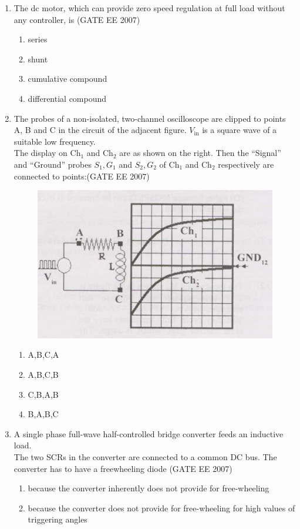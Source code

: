 \documentclass[a4paper,10pt]{exam}
\theoremstyle{remark}
\begin{document}
\begin{enumerate}
\item  The dc motor, which can provide zero speed regulation at full load without any controller, is \hfill{(GATE EE 2007)} 

\begin{multicols}{4}
\begin{enumerate}
 \item series
\item  shunt
\item cumulative compound
\item  differential compound
\end{enumerate}
\end{multicols}

\item  The probes of a non-isolated, two-channel oscilloscope are clipped to points A, B and C in the circuit of the adjacent figure. $V_{\text{in}}$ is a square wave of a suitable low frequency. \\
The display on Ch$_1$ and Ch$_2$ are as shown on the right. Then the ``Signal'' and ``Ground'' probes $S_1, G_1$ and $S_2, G_2$ of Ch$_1$ and Ch$_2$ respectively are connected to points:\hfill{(GATE EE 2007)} 

\begin{figure}[H]
    \centering
    \includegraphics[width=0.6\linewidth]{figs/Q 17.png}
\end{figure}

\begin{multicols}{4}
\begin{enumerate}
 \item  A,B,C,A
\item A,B,C,B
\item  C,B,A,B 
\item  B,A,B,C
\end{enumerate}
\end{multicols}

\item  A single phase full-wave half-controlled bridge converter feeds an inductive load. \\
The two SCRs in the converter are connected to a common DC bus. The converter has to have a freewheeling diode \hfill{(GATE EE 2007)} 
\begin{enumerate}
\item  because the converter inherently does not provide for free-wheeling
\item because the converter does not provide for free-wheeling for high values of triggering angles


\end{enumerate}
\end{enumerate}
\end{document}
